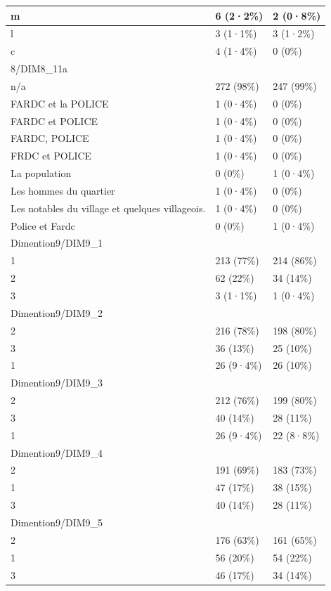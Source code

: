\documentclass[
]{book}
\begin{document}
\begin{tabular}{l|l|l}
\hline
m & 6 (2·2\%) & 2 (0·8\%)\\
\hline
l & 3 (1·1\%) & 3 (1·2\%)\\
\hline
c & 4 (1·4\%) & 0 (0\%)\\
\hline
8/DIM8\_11a &  & \\
\hline
n/a & 272 (98\%) & 247 (99\%)\\
\hline
FARDC et la POLICE & 1 (0·4\%) & 0 (0\%)\\
\hline
FARDC et POLICE & 1 (0·4\%) & 0 (0\%)\\
\hline
FARDC, POLICE & 1 (0·4\%) & 0 (0\%)\\
\hline
FRDC et POLICE & 1 (0·4\%) & 0 (0\%)\\
\hline
La population & 0 (0\%) & 1 (0·4\%)\\
\hline
Les hommes du quartier & 1 (0·4\%) & 0 (0\%)\\
\hline
Les notables du village et quelques villageois. & 1 (0·4\%) & 0 (0\%)\\
\hline
Police et Fardc & 0 (0\%) & 1 (0·4\%)\\
\hline
Dimention9/DIM9\_1 &  & \\
\hline
1 & 213 (77\%) & 214 (86\%)\\
\hline
2 & 62 (22\%) & 34 (14\%)\\
\hline
3 & 3 (1·1\%) & 1 (0·4\%)\\
\hline
Dimention9/DIM9\_2 &  & \\
\hline
2 & 216 (78\%) & 198 (80\%)\\
\hline
3 & 36 (13\%) & 25 (10\%)\\
\hline
1 & 26 (9·4\%) & 26 (10\%)\\
\hline
Dimention9/DIM9\_3 &  & \\
\hline
2 & 212 (76\%) & 199 (80\%)\\
\hline
3 & 40 (14\%) & 28 (11\%)\\
\hline
1 & 26 (9·4\%) & 22 (8·8\%)\\
\hline
Dimention9/DIM9\_4 &  & \\
\hline
2 & 191 (69\%) & 183 (73\%)\\
\hline
1 & 47 (17\%) & 38 (15\%)\\
\hline
3 & 40 (14\%) & 28 (11\%)\\
\hline
Dimention9/DIM9\_5 &  & \\
\hline
2 & 176 (63\%) & 161 (65\%)\\
\hline
1 & 56 (20\%) & 54 (22\%)\\
\hline
3 & 46 (17\%) & 34 (14\%)\\

\end{tabular}
\end{document}
